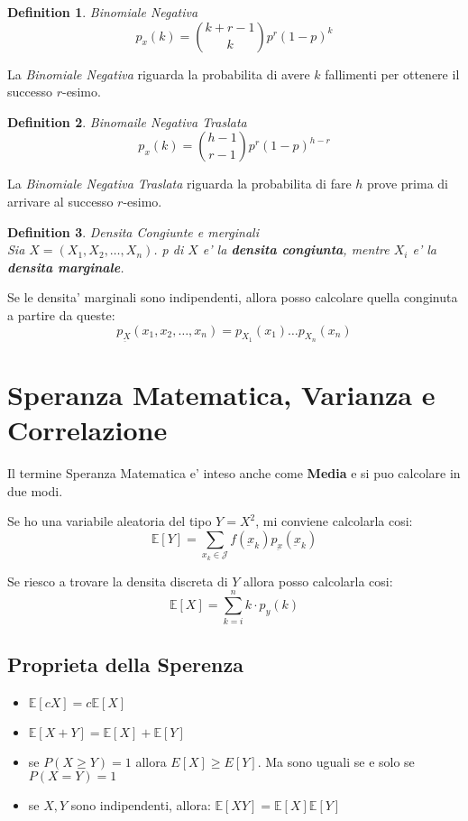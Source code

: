 \documentclass{article}
\newtheorem{definition}{Definition}[section]
\begin{document}
    \begin{definition} Binomiale Negativa
        $$
        p_x(k) = \binom{k+r-1}{k}p^r(1-p)^k
        $$
    \end{definition}

    La \textit{Binomiale Negativa} riguarda la probabilita di avere $k$ fallimenti per ottenere il successo $r$-esimo.

    \begin{definition} Binomaile Negativa Traslata
        $$
        p_x(k) = \binom{h-1}{r-1} p^r (1-p)^{h-r}
        $$
    \end{definition}

    La \textit {Binomiale Negativa Traslata} riguarda la probabilita di fare $h$ prove prima di arrivare al successo $r$-esimo.

    \begin{definition} Densita Congiunte e merginali\\
        Sia $X=(X_1, X_2, \dots, X_n)$. p di $X$ e' la \textbf{densita congiunta}, mentre $X_i$ e' la 
        \textbf{densita marginale}.
    \end{definition}

    Se le densita' marginali sono indipendenti, allora posso calcolare quella conginuta a partire da queste:
    $$
    p_{\underbar X}(x_1, x_2, \dots, x_n) = p_{X_1}(x_1) \dots p_{X_n}({x_n})
    $$

    \newpage
    \section { Speranza Matematica, Varianza e Correlazione }
    Il termine Speranza Matematica e' inteso anche come \textbf{Media} e si puo calcolare in due modi.
    
    Se ho una variabile aleatoria del tipo $Y=X^2$, mi conviene calcolarla cosi:
    $$
    \mathbb E[Y] = \sum_{x_k \in \mathcal J} f(\underbar{x}_k) p_{\underbar{x}}(\underbar{x}_k)
    $$

    Se riesco a trovare la densita discreta di $Y$ allora posso calcolarla cosi:
    $$
    \mathbb E[X] = \sum_{k=i}^n k \cdot p_y (k)
    $$

    \subsection{Proprieta della Sperenza}
    \begin{itemize}
        \item $\mathbb E[cX] = c \mathbb E[X]$
        \item $\mathbb E[X+Y] = \mathbb E[X] + \mathbb E[Y]$
        \item se $P(X \geq Y) = 1$ allora $E[X] \geq E[Y]$. Ma sono uguali se e solo se $P(X=Y)=1$
        \item se $X, Y$ sono indipendenti, allora: $\mathbb E[X Y] = \mathbb E[X] \mathbb E[Y]$
    \end{itemize}
\end{document}

